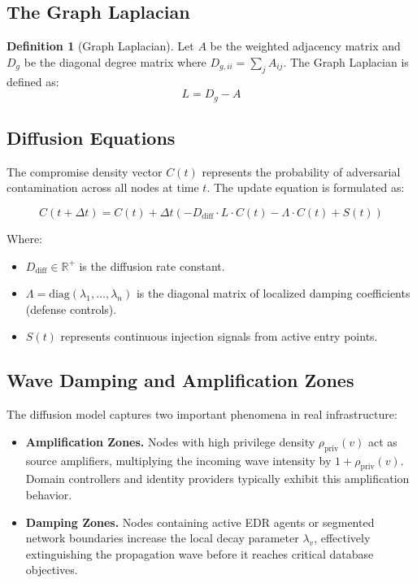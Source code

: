 \documentclass[11pt,a4paper]{article}
\theoremstyle{definition}
\newtheorem{definition}{Definition}[section]
\numberwithin{equation}{section}
\newcommand{\R}{\mathbb{R}}
\begin{document}
\subsection{The Graph Laplacian}\label{subsec:laplacian}

\begin{definition}[Graph Laplacian]
Let $A$ be the weighted adjacency matrix and $D_g$ be the diagonal degree matrix where $D_{g, ii} = \sum_j A_{ij}$. The Graph Laplacian is defined as:
\begin{equation}\label{eq:laplacian}
L = D_g - A
\end{equation}
\end{definition}

\subsection{Diffusion Equations}\label{subsec:diffusion}

The compromise density vector $C(t)$ represents the probability of adversarial contamination across all nodes at time $t$. The update equation is formulated as:

\begin{equation}\label{eq:diffusion}
C(t + \Delta t) = C(t) + \Delta t \left( -D_{\text{diff}} \cdot L \cdot C(t) - \Lambda \cdot C(t) + S(t) \right)
\end{equation}

Where:
\begin{itemize}[leftmargin=2em]
    \item $D_{\text{diff}} \in \R^+$ is the diffusion rate constant.
    \item $\Lambda = \text{diag}(\lambda_1, \dots, \lambda_n)$ is the diagonal matrix of localized damping coefficients (defense controls).
    \item $S(t)$ represents continuous injection signals from active entry points.
\end{itemize}

\subsection{Wave Damping and Amplification Zones}\label{subsec:wave-zones}

The diffusion model captures two important phenomena in real infrastructure:

\begin{itemize}[leftmargin=2em]
    \item \textbf{Amplification Zones.} Nodes with high privilege density $\rho_{\text{priv}}(v)$ act as source amplifiers, multiplying the incoming wave intensity by $1 + \rho_{\text{priv}}(v)$. Domain controllers and identity providers typically exhibit this amplification behavior.

    \item \textbf{Damping Zones.} Nodes containing active EDR agents or segmented network boundaries increase the local decay parameter $\lambda_v$, effectively extinguishing the propagation wave before it reaches critical database objectives.
\end{itemize}
\end{document}
